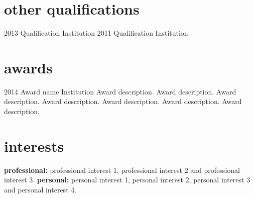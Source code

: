 \documentclass[]{cv-style}          %
\begin{document}

\section{other qualifications}

\begin{entrylist}
\entry
{2013}
{Qualification}
{Institution}
{\vspace{-0.3cm}}
\entry
{2011}
{Qualification}
{Institution}
{\vspace{-0.3cm}}
\end{entrylist}


\section{awards}

\begin{entrylist}
\entry
{2014}
{Award name}
{Institution}
{Award description. Award description. Award description. Award description. Award description. Award description. Award description. }
\end{entrylist}


\section{interests}
  \vspace{-0.2cm}

\textbf{professional:} professional interest 1, professional interest 2 and professional interest 3. \textbf{personal:} personal interest 1, personal interest 2, personal interest 3 and personal interest 4.

\end{document}
